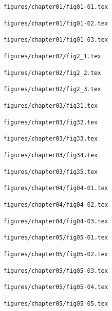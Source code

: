 \documentclass[11pt,a4paper]{article}
\begin{document}
\clearpage
\noindent\texttt{figures/chapter01/fig01-01.tex}


\clearpage
\noindent\texttt{figures/chapter01/fig01-02.tex}


\clearpage
\noindent\texttt{figures/chapter01/fig01-03.tex}


\clearpage
\noindent\texttt{figures/chapter02/fig2\_1.tex}


\clearpage
\noindent\texttt{figures/chapter02/fig2\_2.tex}


\clearpage
\noindent\texttt{figures/chapter02/fig2\_3.tex}


\clearpage
\noindent\texttt{figures/chapter03/fig31.tex}


\clearpage
\noindent\texttt{figures/chapter03/fig32.tex}


\clearpage
\noindent\texttt{figures/chapter03/fig33.tex}


\clearpage
\noindent\texttt{figures/chapter03/fig34.tex}


\clearpage
\noindent\texttt{figures/chapter03/fig35.tex}


\clearpage
\noindent\texttt{figures/chapter04/fig04-01.tex}


\clearpage
\noindent\texttt{figures/chapter04/fig04-02.tex}


\clearpage
\noindent\texttt{figures/chapter04/fig04-03.tex}


\clearpage
\noindent\texttt{figures/chapter05/fig05-01.tex}


\clearpage
\noindent\texttt{figures/chapter05/fig05-02.tex}


\clearpage
\noindent\texttt{figures/chapter05/fig05-03.tex}


\clearpage
\noindent\texttt{figures/chapter05/fig05-04.tex}


\clearpage
\noindent\texttt{figures/chapter05/fig05-05.tex}

\end{document}

